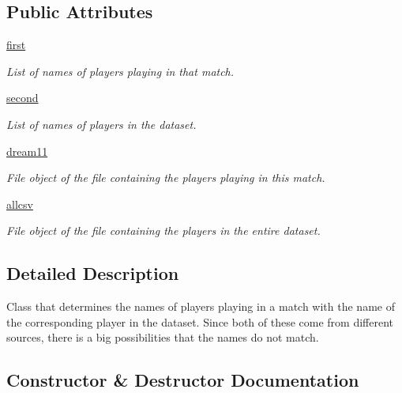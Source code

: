 \subsection*{Public Attributes}
\begin{DoxyCompactItemize}
\item 
\hyperlink{classname_1_1AllNames_af05034a1d261190ebd396ee615052d8e}{first}
\begin{DoxyCompactList}\small\item\em List of names of players playing in that match. \end{DoxyCompactList}\item 
\hyperlink{classname_1_1AllNames_a414e627444762afcc47ead0015f1dcce}{second}
\begin{DoxyCompactList}\small\item\em List of names of players in the dataset. \end{DoxyCompactList}\item 
\hyperlink{classname_1_1AllNames_a3fe1dd6f5e33b95faf2eca8d8dce3cc1}{dream11}
\begin{DoxyCompactList}\small\item\em File object of the file containing the players playing in this match. \end{DoxyCompactList}\item 
\hyperlink{classname_1_1AllNames_a1c94841db2dd8ff636014a0029e11673}{allcsv}
\begin{DoxyCompactList}\small\item\em File object of the file containing the players in the entire dataset. \end{DoxyCompactList}\end{DoxyCompactItemize}


\subsection{Detailed Description}
\begin{DoxyVerb}Class that determines the names of players playing in a match with the name of the corresponding player in the dataset. Since both of these come from different sources, there is a big possibilities that the names do not match.
\end{DoxyVerb}
 

\subsection{Constructor \& Destructor Documentation}
\mbox{\label{classname_1_1AllNames_ac3662eb1bdbc32f6a3baa780a8d6a18c}} 
